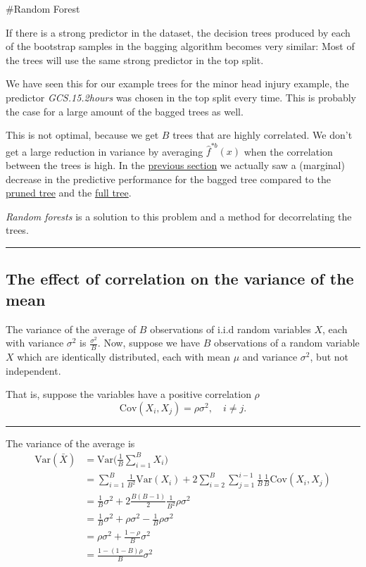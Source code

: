 \documentclass[]{article}
\begin{document}
\#Random Forest

If there is a strong predictor in the dataset, the decision trees
produced by each of the bootstrap samples in the bagging algorithm
becomes very similar: Most of the trees will use the same strong
predictor in the top split.

We have seen this for our example trees for the minor head injury
example, the predictor \emph{GCS.15.2hours} was chosen in the top split
every time. This is probably the case for a large amount of the bagged
trees as well.

This is not optimal, because we get \(B\) trees that are highly
correlated. We don't get a large reduction in variance by averaging
\(\hat{f}^{*b}(x)\) when the correlation between the trees is high. In
the \protect\hyperlink{bagex}{previous section} we actually saw a
(marginal) decrease in the predictive performance for the bagged tree
compared to the \protect\hyperlink{expruning}{pruned tree} and the
\protect\hyperlink{classtree2}{full tree}.

\emph{Random forests} is a solution to this problem and a method for
decorrelating the trees.

\begin{center}\rule{0.5\linewidth}{\linethickness}\end{center}

\hypertarget{the-effect-of-correlation-on-the-variance-of-the-mean}{%
\subsection{The effect of correlation on the variance of the
mean}\label{the-effect-of-correlation-on-the-variance-of-the-mean}}

The variance of the average of \(B\) observations of i.i.d random
variables \(X\), each with variance \(\sigma^2\) is
\(\frac{\sigma^2}{B}\). Now, suppose we have \(B\) observations of a
random variable \(X\) which are identically distributed, each with mean
\(\mu\) and variance \(\sigma^2\), but not independent.

That is, suppose the variables have a positive correlation \(\rho\)
\[\text{Cov}(X_i, X_j) = \rho \sigma^2, \quad i \neq j.\]

\begin{center}\rule{0.5\linewidth}{\linethickness}\end{center}

The variance of the average is
\[\begin{aligned} \text{Var}(\bar{X}) &= \text{Var}\Big( \frac{1}{B}\sum_{i=1}^B X_i \Big) \\
&= \sum_{i=1}^B \frac{1}{B^2} \text{Var} (X_i) + 2 \sum_{i=2}^B \sum_{j=1}^{i-1} \frac{1}{B} \frac{1}{B} \text{Cov} (X_i, X_j) \\
&= \frac{1}{B} \sigma^2 + 2 \frac{B(B-1)}{2}\frac{1}{B^2} \rho \sigma^2 \\
&= \frac{1}{B} \sigma^2 + \rho \sigma^2 - \frac{1}{B} \rho \sigma^2 \\
&= \rho \sigma^2 + \frac{1-\rho}{B}\sigma^2\\
&= \frac{1-(1-B)\rho}{B} \sigma^2\\ \end{aligned}\]
\end{document}
